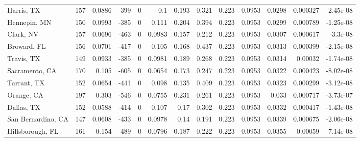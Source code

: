 \documentclass[12pt,letterpaper]{article}
\begin{document}
\begin{sidewaystable}
{\begin{tabular}{lrrrrrrrrrrrr}
 Harris, TX         & 157   & 0.0886  & -399   &     0 &          0.1    &           0.193  &         0.321  &              0.223 &             0.0953 &           0.0298  &        0.000327 &       -2.45e-08  \\
 Hennepin, MN       & 150   & 0.0993  & -385   &     0 &          0.111  &           0.204  &         0.394  &              0.223 &             0.0953 &           0.0299  &        0.000789 &       -1.25e-08  \\
 Clark, NV          & 157   & 0.0696  & -463   &     0 &          0.0983 &           0.157  &         0.212  &              0.223 &             0.0953 &           0.0307  &        0.000617 &       -3.3e-08   \\
 Broward, FL        & 156   & 0.0701  & -417   &     0 &          0.105  &           0.168  &         0.437  &              0.223 &             0.0953 &           0.0313  &        0.000399 &       -2.15e-08  \\
 Travis, TX         & 149   & 0.0933  & -385   &     0 &          0.0981 &           0.189  &         0.268  &              0.223 &             0.0953 &           0.0314  &        0.00032  &       -1.74e-08  \\
 Sacramento, CA     & 170   & 0.105   & -605   &     0 &          0.0654 &           0.173  &         0.247  &              0.223 &             0.0953 &           0.0322  &        0.000423 &       -8.02e-08  \\
 Tarrant, TX        & 152   & 0.0654  & -441   &     0 &          0.098  &           0.135  &         0.409  &              0.223 &             0.0953 &           0.0323  &        0.000299 &       -3.12e-08  \\
 Orange, CA         & 197   & 0.303   & -546   &     0 &          0.0755 &           0.231  &         0.261  &              0.223 &             0.0953 &           0.033   &        0.000717 &       -3.73e-07  \\
 Dallas, TX         & 152   & 0.0588  & -414   &     0 &          0.107  &           0.17   &         0.302  &              0.223 &             0.0953 &           0.0332  &        0.000417 &       -1.43e-08  \\
 San Bernardino, CA & 147   & 0.0608  & -433   &     0 &          0.0978 &           0.14   &         0.191  &              0.223 &             0.0953 &           0.0339  &        0.000675 &       -2.06e-08  \\
 Hillsborough, FL   & 161   & 0.154   & -489   &     0 &          0.0796 &           0.187  &         0.222  &              0.223 &             0.0953 &           0.0355  &        0.00059  &       -7.14e-08  \\

\end{tabular}}
\end{sidewaystable}
\end{document}
